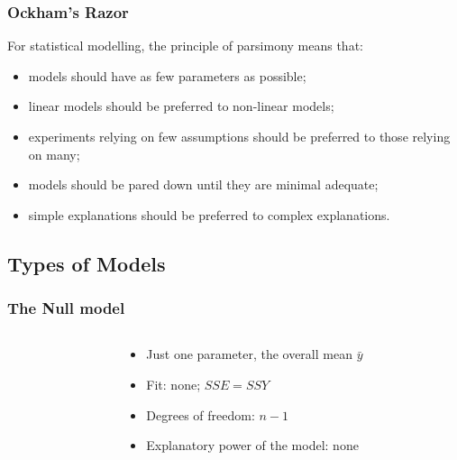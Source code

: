 \documentclass[xcolor={table},handout]{beamer}
\begin{document}
\begin{frame}\frametitle{Ockham's Razor}

For statistical modelling, the principle of
parsimony means that:
\begin{itemize}
\item models should have as few parameters as possible;
\item linear models should be preferred to non-linear models;
\item experiments relying on few assumptions should be preferred to those relying on many;
\item models should be pared down until they are minimal adequate;
\item simple explanations should be preferred to complex explanations.
\end{itemize}
\end{frame}

\subsection{Types of Models}

\begin{frame}\frametitle{The Null model}
\begin{columns}
\begin{column}{0.6\textwidth}
\end{column}
\begin{column}{0.4\textwidth}
\begin{itemize}
\item Just one parameter, the overall mean $\bar{y}$
\item Fit: none; $SSE = SSY$
\item Degrees of freedom: $n-1$
\item Explanatory power of the model: none
\end{itemize}
\end{column}
\end{columns}
\end{frame}
\end{document}
